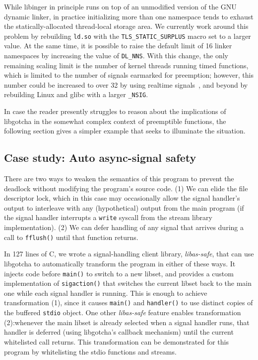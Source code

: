 While libinger in principle runs on top of an unmodified version of the GNU dynamic
linker, in practice initializing more than one namespace tends to exhaust the
statically-allocated thread-local storage area.  We currently work around this
problem by rebuilding \texttt{ld.so} with the \texttt{TLS\_STATIC\_SURPLUS} macro set
to a larger value.  At the same time, it is possible to raise the default limit
of 16 linker namespaces by increasing the value of \texttt{DL\_NNS}.  With this
change, the only remaining scaling limit is the number of kernel threads running
timed functions, which is limited to the number of signals earmarked for preemption;
however, this number could be increased to over 32 by using realtime
signals~\cite{signal-manpage}, and beyond by rebuilding Linux and glibc with a larger
\texttt{\_NSIG}.

\vspace{\parsep}
In case the reader presently struggles to reason about the implications of libgotcha
in the somewhat complex context of preemptible functions, the following section gives
a simpler example that seeks to illuminate the situation.

\subsection{Case study: Auto async-signal safety}
\label{sec:statefulness}

There are two ways to weaken the semantics of this program to prevent the deadlock
without modifying the program's source code.  (1) We can elide the file descriptor
lock, which in this case may occasionally allow the signal handler's output to
interleave with any (hypothetical) output from the main program (if the signal
handler interrupts a \texttt{write} syscall from the stream library implementation).
(2) We can defer handling of any signal that arrives during a call to
\texttt{fflush()} until that function returns.

In 127 lines of C, we wrote a signal-handling client library, \textit{libas-safe},
that can use libgotcha to automatically transform the program in either of these
ways.  It
injects code before \texttt{main()} to switch to a new libset, and provides a custom
implementation of \texttt{sigaction()} that switches the current libset back to the
main one while each signal handler is running.  This is enough to achieve
transformation (1), since it causes \texttt{main()} and \texttt{handler()} to use
distinct copies of the buffered \texttt{stdio} object.  One other \textit{libas-safe}
feature enables transformation (2):\@ whenever the main libset is already selected
when a signal handler runs, that handler is deferred (using libgotcha's callback
mechanism) until the current whitelisted call returns.  This transformation can be
demonstrated for this program by whitelisting the stdio functions and streams.

